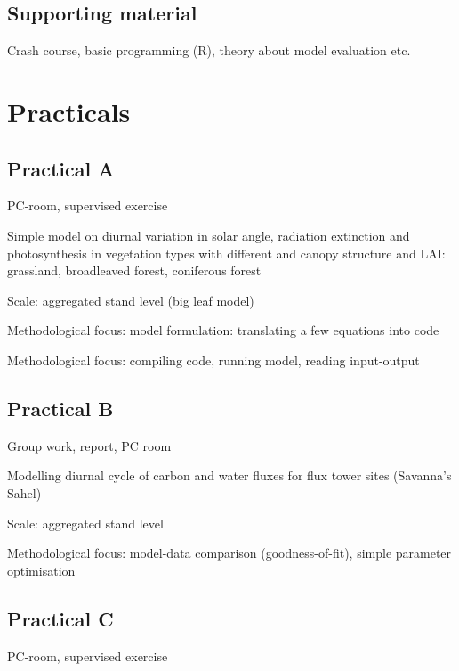 \documentclass[oneside]{book}
\begin{document}
\chapter*{Supporting material}\label{supporting-material}

Crash course, basic programming (R), theory about model evaluation etc.

\part{Practicals}\label{part-practicals}

\chapter*{Practical A}\label{practical-a}

PC-room, supervised exercise

Simple model on diurnal variation in solar angle, radiation extinction
and photosynthesis in vegetation types with different and canopy
structure and LAI: grassland, broadleaved forest, coniferous forest

Scale: aggregated stand level (big leaf model)

Methodological focus: model formulation: translating a few equations
into code

Methodological focus: compiling code, running model, reading
input-output

\chapter*{Practical B}\label{practical-b}

Group work, report, PC room

Modelling diurnal cycle of carbon and water fluxes for flux tower sites
(Savanna's Sahel)

Scale: aggregated stand level

Methodological focus: model-data comparison (goodness-of-fit), simple
parameter optimisation

\chapter*{Practical C}\label{practical-c}

PC-room, supervised exercise
\end{document}

